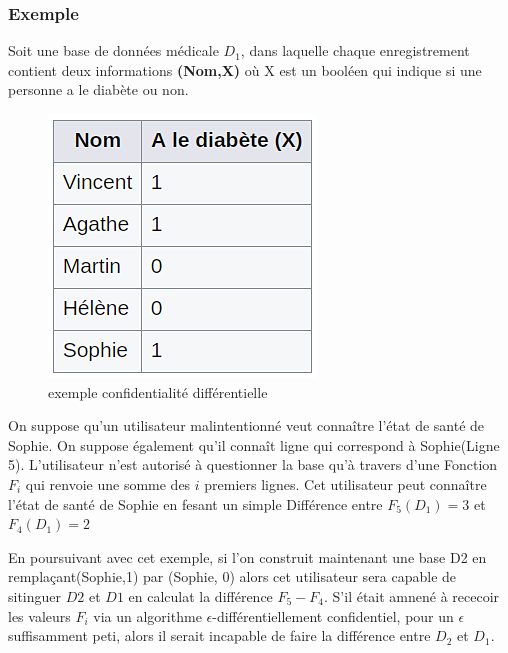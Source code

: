 \subsubsection{Exemple}
Soit une base de données médicale \begin{math}D_{1}\end{math}, dans laquelle chaque enregistrement contient deux informations \textbf{(Nom,X)} où X est un booléen qui indique si une personne a le diabète ou non.
\begin{figure}[!h]
    \centering
    \includegraphics[width=.3\textwidth]{images/anonymisation/confidentialite_diff.png}
    \caption{ exemple confidentialité différentielle}
    \label{fig:exemple confidentialité différentiellel}
\end{figure}
On suppose qu'un utilisateur malintentionné veut connaître l'état de santé de Sophie. On suppose également qu'il connaît ligne qui correspond à Sophie(Ligne 5). L'utilisateur n'est autorisé à questionner la base qu'à travers d'une Fonction \begin{math}F_{i}\end{math} qui renvoie une somme des \begin{math}i\end{math} premiers lignes. Cet utilisateur peut connaître l'état de santé de Sophie en fesant un simple Différence entre \begin{math}F_{5}(D_{1}) = 3\end{math} et \begin{math}F_{4}(D_{1}) = 2\end{math}

En poursuivant avec cet exemple, si l'on construit maintenant une base D2 en remplaçant(Sophie,1) par (Sophie, 0) alors cet utilisateur sera capable de sitinguer \begin{math}D2\end{math} et \begin{math}D1\end{math} en calculat la différence \begin{math}F_{5} - F_{4}\end{math}. S'il était amnené à rececoir les valeurs \begin{math}F_{i}\end{math} via un algorithme \begin{math}\epsilon\end{math}-différentiellement confidentiel, pour un \begin{math}\epsilon\end{math} suffisamment peti, alors il serait incapable de faire la différence entre \begin{math}D_{2}\end{math} et \begin{math}D_{1}\end{math}.

